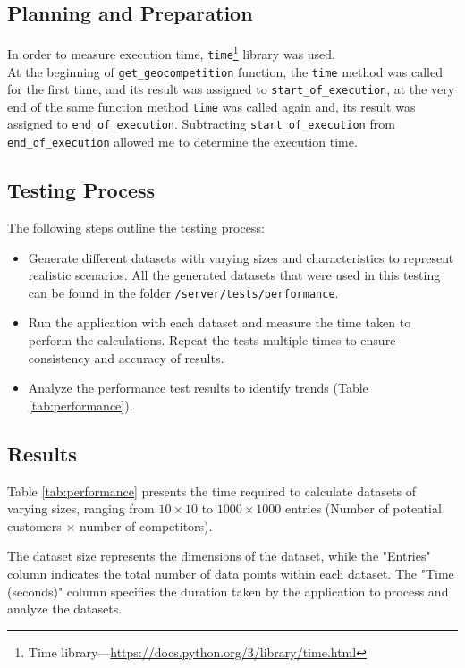 \subsection{Planning and Preparation}

In order to measure execution time, \texttt{time}\footnote{Time library---\url{https://docs.python.org/3/library/time.html}} library was used.\\At the beginning of \texttt{get\_geocompetition} function, the \texttt{time} method was called for the first time, and its result was assigned to \texttt{start\_of\_execution}, at the very end of the same function method \texttt{time} was called again and, its result was assigned to \texttt{end\_of\_execution}. Subtracting \texttt{start\_of\_execution} from \texttt{end\_of\_execution} allowed me to determine the execution time.

\subsection{Testing Process}

The following steps outline the testing process:

\begin{itemize}
    \item Generate different datasets with varying sizes and characteristics to represent realistic scenarios. All the generated datasets that were used in this testing can be found in the folder \texttt{/server/tests/performance}.
    \item Run the application with each dataset and measure the time taken to perform the calculations. Repeat the tests multiple times to ensure consistency and accuracy of results.
    \item Analyze the performance test results to identify trends (Table \ref{tab:performance}).
\end{itemize}

\subsection{Results}

Table \ref{tab:performance} presents the time required to calculate datasets of varying sizes, ranging from $10\times10$ to $1000\times1000$ entries (Number of potential customers $\times$ number of competitors). 

The dataset size represents the dimensions of the dataset, while the "Entries" column indicates the total number of data points within each dataset. The "Time (seconds)" column specifies the duration taken by the application to process and analyze the datasets.

